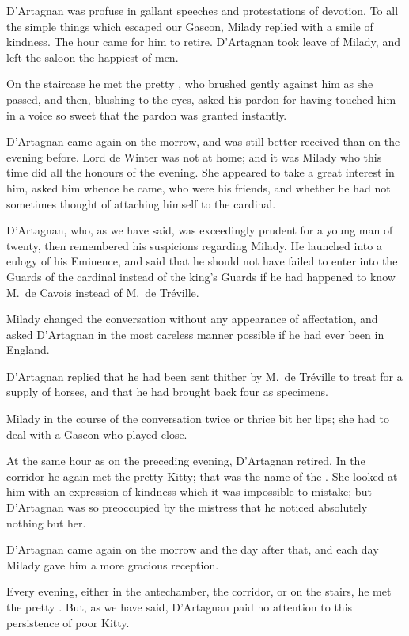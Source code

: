 D'Artagnan was profuse in gallant speeches and protestations of devotion. To all the simple things which escaped our Gascon, Milady replied with a smile of kindness. The hour came for him to retire. D'Artagnan took leave of Milady, and left the saloon the happiest of men. 

On the staircase he met the pretty , who brushed gently against him as she passed, and then, blushing to the eyes, asked his pardon for having touched him in a voice so sweet that the pardon was granted instantly. 

D'Artagnan came again on the morrow, and was still better received than on the evening before. Lord de Winter was not at home; and it was Milady who this time did all the honours of the evening. She appeared to take a great interest in him, asked him whence he came, who were his friends, and whether he had not sometimes thought of attaching himself to the cardinal. 

D'Artagnan, who, as we have said, was exceedingly prudent for a young man of twenty, then remembered his suspicions regarding Milady. He launched into a eulogy of his Eminence, and said that he should not have failed to enter into the Guards of the cardinal instead of the king's Guards if he had happened to know M.~de Cavois instead of M.~de Tréville. 

Milady changed the conversation without any appearance of affectation, and asked D'Artagnan in the most careless manner possible if he had ever been in England. 

D'Artagnan replied that he had been sent thither by M.~de Tréville to treat for a supply of horses, and that he had brought back four as specimens. 

Milady in the course of the conversation twice or thrice bit her lips; she had to deal with a Gascon who played close. 

At the same hour as on the preceding evening, D'Artagnan retired. In the corridor he again met the pretty Kitty; that was the name of the . She looked at him with an expression of kindness which it was impossible to mistake; but D'Artagnan was so preoccupied by the mistress that he noticed absolutely nothing but her. 

D'Artagnan came again on the morrow and the day after that, and each day Milady gave him a more gracious reception. 

Every evening, either in the antechamber, the corridor, or on the stairs, he met the pretty . But, as we have said, D'Artagnan paid no attention to this persistence of poor Kitty.